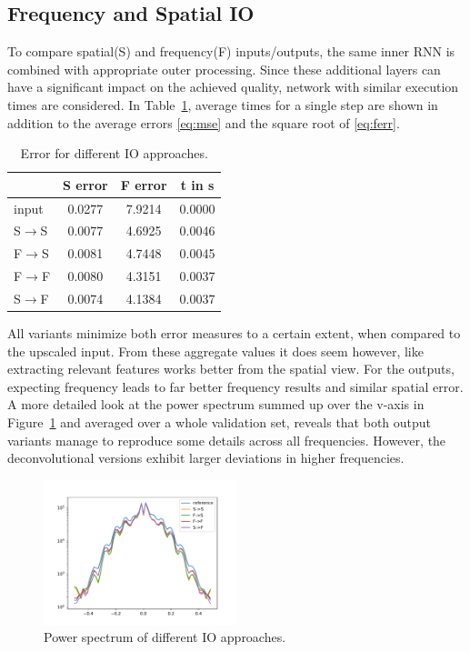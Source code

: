 \documentclass[sigconf]{acmart}
\begin{document}
\subsection{Frequency and Spatial IO}
To compare spatial(S) and frequency(F) inputs/outputs, the same inner RNN is combined with appropriate outer processing. Since these additional layers can have a significant impact on the achieved quality, network with similar execution times are considered. In Table~\ref{tab:freqIO}, average times for a single step are shown in addition to the average errors \eqref{eq:mse} and the square root of \eqref{eq:ferr}.
\begin{table}
\centering
\caption{Error for different IO approaches.}
\label{tab:freqIO}
\begin{tabular}{lccc}
	\hline
	    & S error & F error & t in s \\ \hline
	input           & 0.0277 & 7.9214 & 0.0000 \\
	S$\rightarrow$S & 0.0077 & 4.6925 & 0.0046 \\
	F$\rightarrow$S & 0.0081 & 4.7448 & 0.0045 \\
	F$\rightarrow$F & 0.0080 & 4.3151 & 0.0037 \\
	S$\rightarrow$F & 0.0074 & 4.1384 & 0.0037 \\ \hline
\end{tabular}
\end{table}
All variants minimize both error measures to a certain extent, when compared to the upscaled input.
From these aggregate values it does seem however, like extracting relevant features works better from the spatial view. For the outputs, expecting frequency leads to far better frequency results and similar spatial error.
A more detailed look at the power spectrum summed up over the v-axis in Figure~\ref{powerspectrum} and averaged over a whole validation set, reveals that both output variants manage to reproduce some details across all frequencies. However, the deconvolutional versions exhibit larger deviations in higher frequencies.
\begin{figure}
	\includegraphics[width=0.5\textwidth]{imgs/powerspectrum.pdf}
	\caption{Power spectrum of different IO approaches.}
	\label{powerspectrum}
\end{figure}
\end{document}

